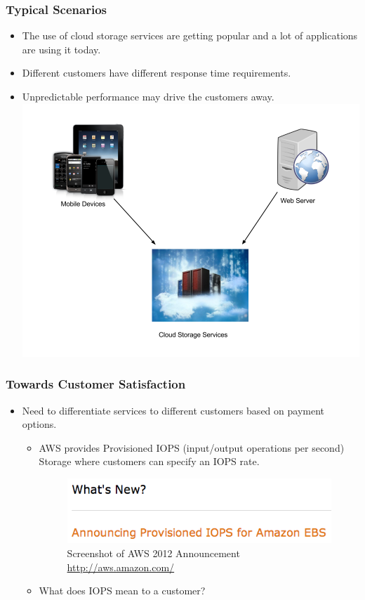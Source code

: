 \documentclass{beamer}
\begin{document}
\begin{frame}
  \frametitle{Typical Scenarios}
  \begin{itemize}
  \item The use of cloud storage services are getting popular and a lot of
    applications are using it today.
  \item Different customers have different response time requirements.
  \item Unpredictable performance may drive the customers away.
    \includegraphics[scale=0.26]{img/A_Cloud_Example.png}
  \end{itemize}
\end{frame}


\begin{frame}
  \frametitle{Towards Customer Satisfaction}
  \begin{itemize}
  \item Need to differentiate services to different customers based on
    payment options.
    \begin{itemize}
    \item AWS provides Provisioned IOPS (input/output operations per second)
      Storage where customers can specify an IOPS rate.
      \begin{figure}
      \flushleft
      \includegraphics[scale=0.46]{img/IOPS.png}
      \caption{Screenshot of AWS 2012 Announcement \url{http://aws.amazon.com/}}
      \end{figure}
    \item What does IOPS mean to a customer?
    \end{itemize}
  \end{itemize}
\end{frame}
\end{document}
